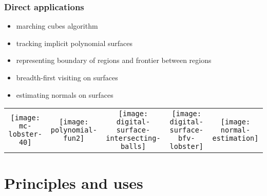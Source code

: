 \documentclass[pdftex,francais]{beamer}
\begin{document}
\begin{frame}%
  \frametitle{Direct applications}

  \begin{itemize}
    \item marching cubes algorithm
    \item tracking implicit polynomial surfaces
    \item representing boundary of regions and frontier between regions
    \item breadth-first visiting on surfaces
    \item estimating normals on surfaces
  \end{itemize}

  \begin{center}
  \begin{tabular}{ccccc}
    \texttt{[image: mc-lobster-40]}&
    \texttt{[image: polynomial-fun2]}&
    \texttt{[image: digital-surface-intersecting-balls]}&
    \texttt{[image: digital-surface-bfv-lobster]}&
    \texttt{[image: normal-estimation]}\\
  \end{tabular}
  \end{center}
\end{frame}


\section{Principles and uses}
\end{document}
